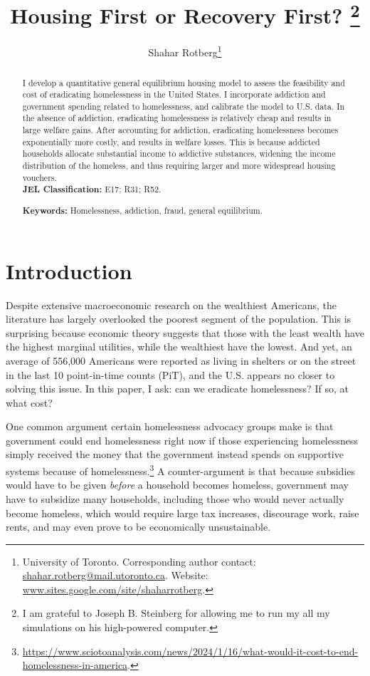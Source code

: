 \documentclass[parskip=full]{article}
\title{\vspace{-1.8cm}Housing First or Recovery First? \footnote{I am grateful to Joseph B. Steinberg for allowing me to run my all my simulations on his high-powered computer.}}
\author{Shahar Rotberg\footnote{University of Toronto. Corresponding author contact: \url{shahar.rotberg@mail.utoronto.ca}. Website: \url{www.sites.google.com/site/shaharrotberg}.}}
\begin{document}
\maketitle

\begin{abstract}
\onehalfspacing
\noindent

\noindentI I develop a quantitative general equilibrium housing model to assess the feasibility and cost of eradicating homelessness in the United States. I incorporate addiction and government spending related to homelessness, and calibrate the model to U.S. data. In the absence of addiction, eradicating homelessness is relatively cheap and results in large welfare gains. After accounting for addiction, eradicating homelessness becomes exponentially more costly, and results in welfare losses. This is because addicted households allocate substantial income to addictive substances, widening the income distribution of the homeless, and thus requiring larger and more widespread housing vouchers. 
\\[1.5ex]


\noindent \textbf{JEL Classification:} E17; R31; R52. 

\noindent \textbf{Keywords:} Homelessness, addiction, fraud, general equilibrium.
\end{abstract}

\section{Introduction}

Despite extensive macroeconomic research on the wealthiest Americans, the literature has largely overlooked the poorest segment of the population. This is surprising because economic theory suggests that those with the least wealth have the highest marginal utilities, while the wealthiest have the lowest. And yet, an average of 556,000 Americans were reported as living in shelters or on the street in the last 10 point-in-time counts (PiT), and the U.S. appears no closer to solving this issue. In this paper, I ask: can we eradicate homelessness? If so, at what cost?

One common argument certain homelessness advocacy groups make is that government could end homelessness right now if those experiencing homelessness simply received the money that the government instead spends on supportive systems because of homelessness.\footnote{\url{https://www.sciotoanalysis.com/news/2024/1/16/what-would-it-cost-to-end-homelessness-in-america}.} A counter-argument is that because subsidies would have to be given \textsl{before} a household becomes homeless, government may have to subsidize many households, including those who would never actually become homeless, which would require large tax increases, discourage work, raise rents, and may even prove to be economically unsustainable. 
\end{document}
